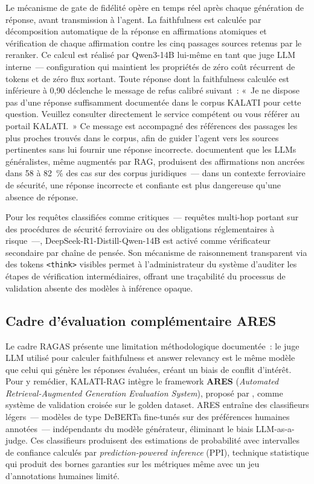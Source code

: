 \documentclass[12pt,a4paper]{report}
\begin{document}
Le mécanisme de gate de fidélité opère en temps réel après chaque génération de réponse, avant
transmission à l'agent. La faithfulness est calculée par décomposition automatique de la réponse
en affirmations atomiques et vérification de chaque affirmation contre les cinq passages sources
retenus par le reranker. Ce calcul est réalisé par Qwen3-14B lui-même en tant que juge LLM
interne~--- configuration qui maintient les propriétés de zéro coût récurrent de tokens et de
zéro flux sortant. Toute réponse dont la faithfulness calculée est inférieure à 0,90 déclenche
le message de refus calibré suivant~: «~Je ne dispose pas d'une réponse suffisamment documentée
dans le corpus KALATI pour cette question. Veuillez consulter directement le service compétent
ou vous référer au portail KALATI.~» Ce message est accompagné des références des passages les
plus proches trouvés dans le corpus, afin de guider l'agent vers les sources pertinentes sans
lui fournir une réponse incorrecte. \textcite{Dahl2024} documentent que les LLMs généralistes,
même augmentés par RAG, produisent des affirmations non ancrées dans 58 à 82~\% des cas sur
des corpus juridiques~--- dans un contexte ferroviaire de sécurité, une réponse incorrecte et
confiante est plus dangereuse qu'une absence de réponse.

Pour les requêtes classifiées comme critiques~--- requêtes multi-hop portant sur des procédures
de sécurité ferroviaire ou des obligations réglementaires à risque~---, DeepSeek-R1-Distill-Qwen-14B
est activé comme vérificateur secondaire par chaîne de pensée. Son mécanisme de raisonnement
transparent via des tokens \texttt{<think>} visibles permet à l'administrateur du système
d'auditer les étapes de vérification intermédiaires, offrant une traçabilité du processus
de validation absente des modèles à inférence opaque.

\subsection{Cadre d'évaluation complémentaire ARES}

Le cadre RAGAS présente une limitation méthodologique documentée~: le juge LLM utilisé pour
calculer faithfulness et answer relevancy est le même modèle que celui qui génère les réponses
évaluées, créant un biais de conflit d'intérêt. Pour y remédier, KALATI-RAG intègre le
framework \textbf{ARES} (\textit{Automated Retrieval-Augmented Generation Evaluation System}),
proposé par \textcite{SaadFalcon2023}, comme système de validation croisée sur le golden dataset.
ARES entraîne des classifieurs légers~--- modèles de type DeBERTa fine-tunés sur des préférences
humaines annotées~--- indépendants du modèle générateur, éliminant le biais LLM-as-a-judge.
Ces classifieurs produisent des estimations de probabilité avec intervalles de confiance calculés
par \textit{prediction-powered inference} (PPI), technique statistique qui produit des bornes
garanties sur les métriques même avec un jeu d'annotations humaines limité.
\end{document}
